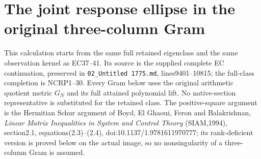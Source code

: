 \documentclass[11pt,a4paper]{article}
\begin{document}
\section{The joint response ellipse in the original three-column Gram}

This calculation starts from the same full retained eigenclass and the same
observation kernel as EC37--41. Its source is the supplied complete EC
continuation, preserved in \texttt{02\_Untitled 1775.md}, lines9401--10815;
the full-class completion is NCRP1--30. Every Gram below uses the original
arithmetic quotient metric $G_N$ and its full attained polynomial lift.
No native-section representative is substituted for the retained class.
The positive-square argument is the Hermitian Schur argument of
Boyd, El Ghaoui, Feron and Balakrishnan, \emph{Linear Matrix Inequalities
in System and Control Theory} (SIAM,1994), section2.1, equations(2.3)--(2.4),
doi:10.1137/1.9781611970777; its rank-deficient version is proved below
on the actual image, so no nonsingularity of a three-column Gram is assumed.
\end{document}
